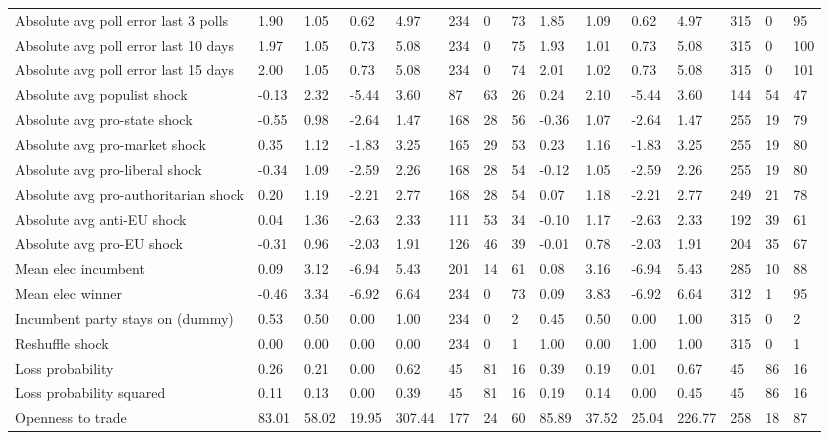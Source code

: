 \begin{longtable}{lllllllllllllll}
\addlinespace
Absolute avg poll error last 3 polls & 1.90 & 1.05 & 0.62 & 4.97 & 234 & 0 & 73 & 1.85 & 1.09 & 0.62 & 4.97 & 315 & 0 & 95\\
Absolute avg poll error last 10 days & 1.97 & 1.05 & 0.73 & 5.08 & 234 & 0 & 75 & 1.93 & 1.01 & 0.73 & 5.08 & 315 & 0 & 100\\
Absolute avg poll error last 15 days & 2.00 & 1.05 & 0.73 & 5.08 & 234 & 0 & 74 & 2.01 & 1.02 & 0.73 & 5.08 & 315 & 0 & 101\\
Absolute avg populist shock & -0.13 & 2.32 & -5.44 & 3.60 & 87 & 63 & 26 & 0.24 & 2.10 & -5.44 & 3.60 & 144 & 54 & 47\\
Absolute avg pro-state shock & -0.55 & 0.98 & -2.64 & 1.47 & 168 & 28 & 56 & -0.36 & 1.07 & -2.64 & 1.47 & 255 & 19 & 79\\
\addlinespace
Absolute avg pro-market shock & 0.35 & 1.12 & -1.83 & 3.25 & 165 & 29 & 53 & 0.23 & 1.16 & -1.83 & 3.25 & 255 & 19 & 80\\
Absolute avg pro-liberal shock & -0.34 & 1.09 & -2.59 & 2.26 & 168 & 28 & 54 & -0.12 & 1.05 & -2.59 & 2.26 & 255 & 19 & 80\\
Absolute avg pro-authoritarian shock & 0.20 & 1.19 & -2.21 & 2.77 & 168 & 28 & 54 & 0.07 & 1.18 & -2.21 & 2.77 & 249 & 21 & 78\\
Absolute avg anti-EU shock & 0.04 & 1.36 & -2.63 & 2.33 & 111 & 53 & 34 & -0.10 & 1.17 & -2.63 & 2.33 & 192 & 39 & 61\\
Absolute avg pro-EU shock & -0.31 & 0.96 & -2.03 & 1.91 & 126 & 46 & 39 & -0.01 & 0.78 & -2.03 & 1.91 & 204 & 35 & 67\\
\addlinespace
Mean elec incumbent & 0.09 & 3.12 & -6.94 & 5.43 & 201 & 14 & 61 & 0.08 & 3.16 & -6.94 & 5.43 & 285 & 10 & 88\\
Mean elec winner & -0.46 & 3.34 & -6.92 & 6.64 & 234 & 0 & 73 & 0.09 & 3.83 & -6.92 & 6.64 & 312 & 1 & 95\\
Incumbent party stays on (dummy) & 0.53 & 0.50 & 0.00 & 1.00 & 234 & 0 & 2 & 0.45 & 0.50 & 0.00 & 1.00 & 315 & 0 & 2\\
Reshuffle shock & 0.00 & 0.00 & 0.00 & 0.00 & 234 & 0 & 1 & 1.00 & 0.00 & 1.00 & 1.00 & 315 & 0 & 1\\
Loss probability & 0.26 & 0.21 & 0.00 & 0.62 & 45 & 81 & 16 & 0.39 & 0.19 & 0.01 & 0.67 & 45 & 86 & 16\\
\addlinespace
Loss probability squared & 0.11 & 0.13 & 0.00 & 0.39 & 45 & 81 & 16 & 0.19 & 0.14 & 0.00 & 0.45 & 45 & 86 & 16\\
Openness to trade & 83.01 & 58.02 & 19.95 & 307.44 & 177 & 24 & 60 & 85.89 & 37.52 & 25.04 & 226.77 & 258 & 18 & 87\\

\end{longtable}
